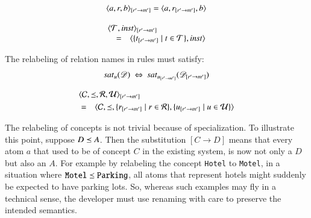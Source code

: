 \documentclass{elsarticle}
\begin{document}
\begin{definition}
   \[\subst{r'}{m'}{\triple{a}{r}{b}} = \triple{a}{\subst{r'}{m'}{r}}{b}\]
\end{definition}
\begin{definition}
   \[\begin{array}{rcl}
      \rlap{$\subst{r'}{m'}{\pair{\triples}{\inst}}$}\\
      &=&\pair{\{\subst{r'}{m'}{t}\mid t\in\triples\}}{\inst}
   \end{array}\]
\end{definition}
   The relabeling of relation names in rules must satisfy:
\begin{equation}
   \sat{u}{\dataset}\ \Leftrightarrow\ \sat{\subst{r'}{m'}{u}}{\subst{r'}{m'}{\dataset}}
\end{equation}
\begin{definition}
   \begin{eqnarray}
      \rlap{$\subst{r'}{m'}{\quadruple{\concepts}{\isa}{\rels}{\rules}}$}\notag\\
      &=&\quadruple{\concepts}{\isa}{\{\subst{r'}{m'}{r} \mid r\in\rels\}}{\{\subst{r'}{m'}{u} \mid u\in\rules\}}\notag
   \end{eqnarray}
\end{definition}
   
   The relabeling of concepts is not trivial because of specialization.
   To illustrate this point, suppose $D\isa A$.
   Then the substitution $[C\rightarrow D]$ means that every atom $a$ that used to be of concept $C$ in the existing system, is now not only a $D$ but also an $A$.
   For example by relabeling the concept {\tt Hotel} to {\tt Motel}, in a situation where ${\tt Motel}\isa{\tt Parking}$,
   all atoms that represent hotels might suddenly be expected to have parking lots.
   So, whereas such examples may fly in a technical sense, the developer must use renaming with care to preserve the intended semantics.
\end{document}
